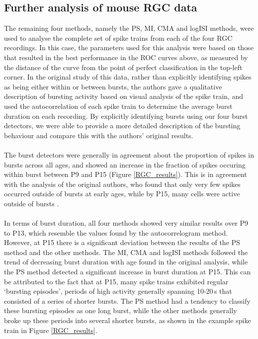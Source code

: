 \documentclass[12pt, titlepage]{article}
\begin{document}
\subsection*{Further analysis of mouse RGC data}
The remaining four methods, namely the PS, MI, CMA and logISI methods, were used to analyse the complete set of spike trains from each of the four RGC recordings. In this case, the parameters used for this analysis were based on those that resulted in the best performance in the ROC curves above, as measured by the distance of the curve from the point of perfect classification in the top-left corner. In the original study of this data, rather than explicitly identifying spikes as being either within or between bursts, the authors gave a qualitative description of bursting activity based on visual analysis of the spike train, and used the autocorrelation of each spike train to determine the average burst duration on each recording. By explicitly identifying bursts using our four burst detectors, we were able to provide a more detailed description of the bursting behaviour and compare this with the authors' original results.
\\ \\ The burst detectors were generally in agreement about the proportion of spikes in bursts across all ages, and showed an increase in the fraction of spikes occuring within burst between P9 and P15 (Figure \ref{RGC_results}). This is in agreement with the analysis of the original authors, who found that only very few spikes occurred outside of bursts at early ages, while by P15, many cells were active outside of bursts \cite{Demas2003}.
\\ \\In terms of burst duration, all four methods showed very similar results over P9 to P13, which resemble the values found by the autocorrelogram method. However, at P15 there is a significant deviation between the results of the PS method and the other methods. The MI, CMA and logISI methods followed the trend of decreasing burst duration with age found in the original analysis, while the PS method detected a significant increase in burst duration at P15. This can be attributed to the fact that at P15, many spike trains exhibited regular `bursting episodes', periods of high activity generally spanning 10-20$\,$s that consisted of a series of shorter bursts. The PS method had a tendency to classify these bursting episodes as one long burst, while the other methods generally broke up these periods into several shorter bursts, as shown in the example spike train in Figure \ref{RGC_results}. 
\end{document}
